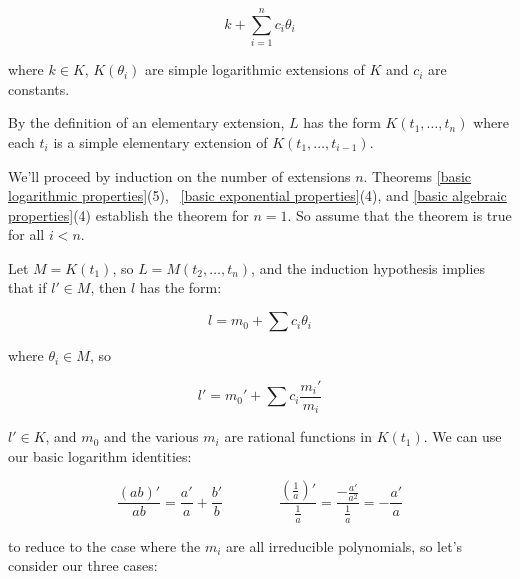 $$k + \sum_{i=1}^n c_i \theta_i$$

where $k\in K$, $K(\theta_i)$ are simple logarithmic extensions of $K$ and $c_i$
are constants.

\proof

By the definition of an elementary extension, $L$ has the form $K(t_1,\ldots,t_n)$
where each $t_i$ is a simple elementary extension of $K(t_1,\ldots,t_{i-1})$.

We'll proceed by induction on the number of extensions $n$.  Theorems \ref{basic logarithmic properties}(5),
\ \ref{basic exponential properties}(4), and \ref{basic algebraic properties}(4)
establish the theorem for $n=1$.  So assume that the theorem is true
for all $i<n$.

Let $M = K(t_1)$, so $L = M(t_2,\ldots,t_n)$,
and the induction hypothesis implies that if $l' \in M$,
then $l$ has the form:

$$l = m_0 + \sum c_i \theta_i$$

where $\theta_i \in M$, so

$$l' = m_0' + \sum c_i \frac{m_i'}{m_i}$$

$l' \in K$, and $m_0$ and the various $m_i$ are rational
functions in $K(t_1)$.  We can use our basic logarithm identities:

$$\frac{(ab)'}{ab} = \frac{a'}{a} + \frac{b'}{b} \qquad\qquad
\frac{(\frac{1}{a})'}{\frac{1}{a}} = \frac{-\frac{a'}{a^2}}{\frac{1}{a}} = - \frac{a'}{a}$$

to reduce to the case where the $m_i$ are all irreducible
polynomials, so let's consider our three cases:

